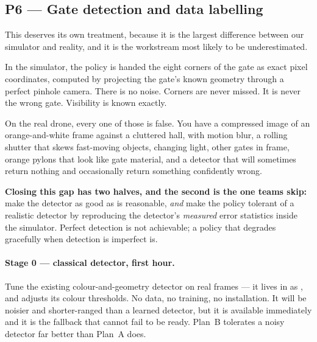 \subsection{P6 --- Gate detection and data labelling}\label{sec:detect}

This deserves its own treatment, because it is the largest difference between our simulator and
reality, and it is the workstream most likely to be underestimated.

\begin{explain}
In the simulator, the policy is handed the eight corners of the gate as exact pixel coordinates,
computed by projecting the gate's known geometry through a perfect pinhole camera. There is no noise.
Corners are never missed. It is never the wrong gate. Visibility is known exactly.

On the real drone, every one of those is false. You have a compressed image of an orange-and-white
frame against a cluttered hall, with motion blur, a rolling shutter that skews fast-moving objects,
changing light, other gates in frame, orange pylons that look like gate material, and a detector that
will sometimes return nothing and occasionally return something confidently wrong.

\textbf{Closing this gap has two halves, and the second is the one teams skip:} make the detector as
good as is reasonable, \emph{and} make the policy tolerant of a realistic detector by reproducing the
detector's \emph{measured} error statistics inside the simulator. Perfect detection is not
achievable; a policy that degrades gracefully when detection is imperfect is.
\end{explain}

\paragraph{Stage 0 --- classical detector, first hour.}
Tune the existing colour-and-geometry detector on real frames --- it lives in  as
, and  adjusts its colour thresholds. No data, no
training, no installation. It will be noisier
and shorter-ranged than a learned detector, but it is available immediately and it is the fallback
that cannot fail to be ready. Plan~B tolerates a noisy detector far better than Plan~A does.

